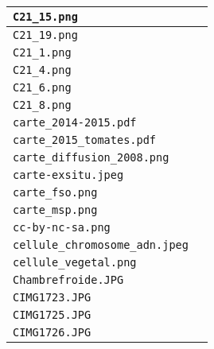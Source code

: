 \begin{center}
\begin{supertabular}{p{.8\textwidth}c}
\texttt{C21\_15.png} & \cite{C21_15} \\ \hline

\texttt{C21\_19.png} & \cite{C21_19} \\ \hline

\texttt{C21\_1.png} & \cite{C21_1} \\ \hline

\texttt{C21\_4.png} & \cite{C21_4} \\ \hline

\texttt{C21\_6.png} & \cite{C21_6} \\ \hline

\texttt{C21\_8.png} & \cite{C21_8} \\ \hline

\texttt{carte\_2014-2015.pdf} & \cite{carte_2014-2015} \\ \hline

\texttt{carte\_2015\_tomates.pdf} & \cite{carte_2015_tomates} \\ \hline

\texttt{carte\_diffusion\_2008.png} & \cite{carte_diffusion_2008} \\ \hline

\texttt{carte-exsitu.jpeg} & \cite{carte-exsitu} \\ \hline

\texttt{carte\_fso.png} & \cite{carte_fso} \\ \hline

\texttt{carte\_msp.png} & \cite{carte_msp} \\ \hline

\texttt{cc-by-nc-sa.png} & \cite{cc-by-nc-sa} \\ \hline

\texttt{cellule\_chromosome\_adn.jpeg} & \cite{cellule_chromosome_adn} \\ \hline

\texttt{cellule\_vegetal.png} & \cite{cellule_vegetal} \\ \hline

\texttt{Chambrefroide.JPG} & \cite{Chambrefroide} \\ \hline

\texttt{CIMG1723.JPG} & \cite{CIMG1723} \\ \hline

\texttt{CIMG1725.JPG} & \cite{CIMG1725} \\ \hline

\texttt{CIMG1726.JPG} & \cite{CIMG1726} \\ \hline


\end{supertabular}
\end{center}
